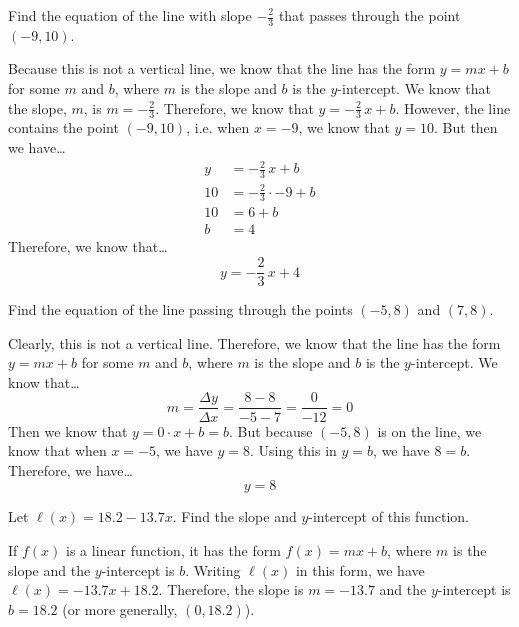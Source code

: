 \documentclass[11pt,letterpaper]{article}
\begin{document}

 Find the equation of the line with slope $-\frac{2}{3}$ that passes through the point $(-9 ,10)$. \pspace

\sol Because this is not a vertical line, we know that the line has the form $y= mx + b$ for some $m$ and $b$, where $m$ is the slope and $b$ is the $y$-intercept. We know that the slope, $m$, is $m= -\frac{2}{3}$. Therefore, we know that $y= -\frac{2}{3}\,x + b$. However, the line contains the point $(-9, 10)$, i.e. when $x= -9$, we know that $y= 10$. But then we have\dots
	\[
	\begin{aligned}
	y&= -\frac{2}{3}\, x + b \\[0.3cm]
	10&= -\frac{2}{3} \cdot -9 + b \\[0.3cm]
	10&= 6 + b \\[0.3cm]
	b&= 4
	\end{aligned}
	\]
Therefore, we know that\dots
	\[
	y= -\frac{2}{3}\, x + 4
	\]



\newpage



 Find the equation of the line passing through the points $(-5, 8)$ and $(7, 8)$. \pspace

\sol Clearly, this is not a vertical line. Therefore, we know that the line has the form $y= mx + b$ for some $m$ and $b$, where $m$ is the slope and $b$ is the $y$-intercept. We know that\dots
	\[
	m= \dfrac{\Delta y}{\Delta x}= \dfrac{8 - 8}{-5 - 7}= \dfrac{0}{-12}= 0
	\]
Then we know that $y= 0 \cdot x + b= b$. But because $(-5, 8)$ is on the line, we know that when $x= -5$, we have $y= 8$. Using this in $y= b$, we have $8= b$. Therefore, we have\dots
	\[
	y= 8
	\]



\newpage



 Let $\ell(x)= 18.2 - 13.7x$. Find the slope and $y$-intercept of this function. \pspace

\sol If $f(x)$ is a linear function, it has the form $f(x)= mx + b$, where $m$ is the slope and the $y$-intercept is $b$. Writing $\ell(x)$ in this form, we have $\ell(x)= -13.7x + 18.2$. Therefore, the slope is $m= -13.7$ and the $y$-intercept is $b= 18.2$ (or more generally, $(0, 18.2)$). 



\newpage
\end{document}

